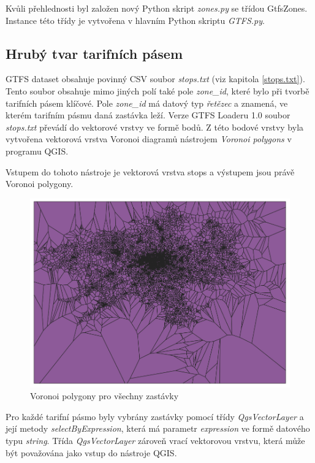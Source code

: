 Kvůli přehlednosti byl založen nový Python skript \textit{zones.py} se třídou GtfsZones. Instance této třídy je vytvořena
v hlavním Python skriptu \textit{GTFS.py}.

\subsection{Hrubý tvar tarifních pásem}

GTFS dataset obsahuje povinný CSV soubor \textit{stops.txt} (viz kapitola \ref{stops.txt}). Tento soubor obsahuje mimo
jiných polí také pole \textit{zone\_id}, které bylo při tvorbě tarifních pásem klíčové.
Pole \textit{zone\_id} má datový typ \textit{řetězec} a znamená, ve kterém tarifním
pásmu daná zastávka leží. Verze GTFS Loaderu 1.0 soubor \textit{stops.txt} převádí do vektorové vrstvy
ve formě bodů. Z této bodové vrstvy byla vytvořena vektorová vrstva Voronoi 
diagramů nástrojem \textit{Voronoi polygons} v programu QGIS. 

Vstupem do tohoto nástroje je vektorová vrstva stops a výstupem jsou právě Voronoi polygony.

\begin{figure}[H] \centering
    \includegraphics[width=400pt]{./pictures/voronoi-stops.png}
    \caption[Voronoi polygony pro všechny zastávky]{Voronoi polygony pro všechny zastávky}
	\label{fig:voronoi-stops}              
\end{figure}
  
Pro každé tarifní pásmo byly vybrány zastávky pomocí třídy \textit{QgsVectorLayer}
a její metody \textit{selectByExpression}, která má parametr \textit{expression} ve formě datového
typu \textit{string}. 
Třída \textit{QgsVectorLayer} zároveň vrací vektorovou vrstvu, která může být považována jako vstup do nástroje QGIS.

